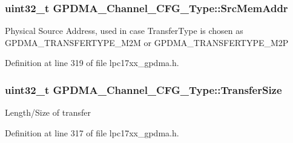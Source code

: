 \hypertarget{struct_g_p_d_m_a___channel___c_f_g___type_a758e9a95071bee63639938563c837520}{
\subsubsection[{\-Src\-Mem\-Addr}]{\setlength{\rightskip}{0pt plus 5cm}uint32\-\_\-t {\bf \-G\-P\-D\-M\-A\-\_\-\-Channel\-\_\-\-C\-F\-G\-\_\-\-Type\-::\-Src\-Mem\-Addr}}}\label{struct_g_p_d_m_a___channel___c_f_g___type_a758e9a95071bee63639938563c837520}
\-Physical \-Source \-Address, used in case \-Transfer\-Type is chosen as \-G\-P\-D\-M\-A\-\_\-\-T\-R\-A\-N\-S\-F\-E\-R\-T\-Y\-P\-E\-\_\-\-M2\-M or \-G\-P\-D\-M\-A\-\_\-\-T\-R\-A\-N\-S\-F\-E\-R\-T\-Y\-P\-E\-\_\-\-M2\-P 

\-Definition at line 319 of file lpc17xx\-\_\-gpdma.\-h.

\hypertarget{struct_g_p_d_m_a___channel___c_f_g___type_acce3ec0eb7297d4294b7038eca4a90f1}{
\subsubsection[{\-Transfer\-Size}]{\setlength{\rightskip}{0pt plus 5cm}uint32\-\_\-t {\bf \-G\-P\-D\-M\-A\-\_\-\-Channel\-\_\-\-C\-F\-G\-\_\-\-Type\-::\-Transfer\-Size}}}\label{struct_g_p_d_m_a___channel___c_f_g___type_acce3ec0eb7297d4294b7038eca4a90f1}
\-Length/\-Size of transfer 

\-Definition at line 317 of file lpc17xx\-\_\-gpdma.\-h.

